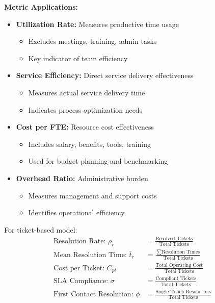 \documentclass[12pt,a4paper]{article}
\newenvironment{definition}[1]
{\begin{mdframed}[style=definitionstyle,frametitle={Definition: #1}]}
{\end{mdframed}}
\newenvironment{explanation}
{\begin{mdframed}[style=explanationstyle,frametitle={Explanation}]}
{\end{mdframed}}
\begin{document}
\begin{explanation}
\textbf{Metric Applications:}
\begin{itemize}
    \item \textbf{Utilization Rate:} Measures productive time usage
        \begin{itemize}
            \item Excludes meetings, training, admin tasks
            \item Key indicator of team efficiency
        \end{itemize}
    \item \textbf{Service Efficiency:} Direct service delivery effectiveness
        \begin{itemize}
            \item Measures actual service delivery time
            \item Indicates process optimization needs
        \end{itemize}
    \item \textbf{Cost per FTE:} Resource cost effectiveness
        \begin{itemize}
            \item Includes salary, benefits, tools, training
            \item Used for budget planning and benchmarking
        \end{itemize}
    \item \textbf{Overhead Ratio:} Administrative burden
        \begin{itemize}
            \item Measures management and support costs
            \item Identifies operational efficiency
        \end{itemize}
\end{itemize}
\end{explanation}

\begin{definition}{Ticket Performance Metrics}
For ticket-based model:
\begin{align*}
    \text{Resolution Rate: } \rho_r &= \frac{\text{Resolved Tickets}}{\text{Total Tickets}} \\[1em]
    \text{Mean Resolution Time: } \bar{t}_r &= \frac{\sum \text{Resolution Times}}{\text{Total Tickets}} \\[1em]
    \text{Cost per Ticket: } C_{pt} &= \frac{\text{Total Operating Cost}}{\text{Total Tickets}} \\[1em]
    \text{SLA Compliance: } \sigma &= \frac{\text{Compliant Tickets}}{\text{Total Tickets}} \\[1em]
    \text{First Contact Resolution: } \phi &= \frac{\text{Single-Touch Resolutions}}{\text{Total Tickets}}
\end{align*}
\end{definition}
\end{document}
